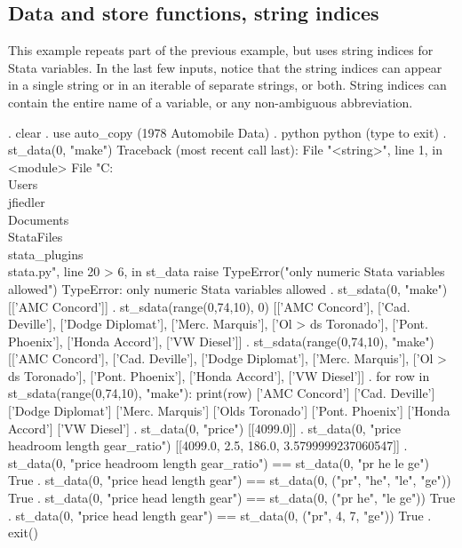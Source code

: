 \documentclass{article}
\begin{document}
\subsection{Data and store functions, string indices} \label{data_and_store_string_example}

This example repeats part of the previous example, but uses string indices for Stata variables. In the last few inputs, notice that the string indices can appear in a single string or in an iterable of separate strings, or both. String indices can contain the entire name of a variable, or any non-ambiguous abbreviation.

\begin{stlog}
{\smallskip}
. clear
{\smallskip}
. use auto_copy
(1978 Automobile Data)
{\smallskip}
. python
 python (type {} to exit) 
. st_data(0, "make")
{\color{red}Traceback (most recent call last):
  File "<string>", line 1, in <module>
  File "C:\\Users\\jfiedler\\Documents\\StataFiles\\stata_plugins\\stata.py", line 20
> 6, in st_data
    raise TypeError("only numeric Stata variables allowed")
TypeError: only numeric Stata variables allowed}
{\smallskip}
. st_sdata(0, "make")
[['AMC Concord']]
{\smallskip}
. st_sdata(range(0,74,10), 0)
[['AMC Concord'], ['Cad. Deville'], ['Dodge Diplomat'], ['Merc. Marquis'], ['Ol
> ds Toronado'], ['Pont. Phoenix'], ['Honda Accord'], ['VW Diesel']]
{\smallskip}
. st_sdata(range(0,74,10), "make")
[['AMC Concord'], ['Cad. Deville'], ['Dodge Diplomat'], ['Merc. Marquis'], ['Ol
> ds Toronado'], ['Pont. Phoenix'], ['Honda Accord'], ['VW Diesel']]
{\smallskip}
. for row in st_sdata(range(0,74,10), "make"): print(row)
['AMC Concord']
['Cad. Deville']
['Dodge Diplomat']
['Merc. Marquis']
['Olds Toronado']
['Pont. Phoenix']
['Honda Accord']
['VW Diesel']
{\smallskip}
. st_data(0, "price")
[[4099.0]]
{\smallskip}
. st_data(0, "price headroom length gear_ratio")
[[4099.0, 2.5, 186.0, 3.5799999237060547]]
{\smallskip}
. st_data(0, "price headroom length gear_ratio") == st_data(0, "pr he le ge")
True
{\smallskip}
. st_data(0, "price head length gear") == st_data(0, ("pr", "he", "le", "ge"))
True
{\smallskip}
. st_data(0, "price head length gear") == st_data(0, ("pr he", "le ge"))
True
{\smallskip}
. st_data(0, "price head length gear") == st_data(0, ("pr", 4, 7, "ge"))
True
{\smallskip}
. exit()
\end{stlog}
\end{document}
